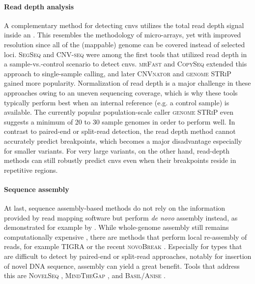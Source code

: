 \paragraph{Read depth analysis}
A complementary method for detecting \acp{cnv} utilizes the total read depth
signal inside an \sv. This resembles the methodology of micro-arrays, yet with
improved resolution since all of the (mappable) genome can be covered instead
of selected loci. \textsc{SegSeq} \citep{Chiang2009} and \textsc{CNV-seq}
\citep{Xie2009} were among the first tools that utilized read depth in a
sample-vs.-control scenario to detect \acp{cnv}. \textsc{mrFast}
\citep{Alkan2009} and \textsc{CopySeq} \citep{Waszak2010} extended this
approach to single-sample \cnv calling, and later \textsc{CNVnator}
\citep{Abyzov2011} and \textsc{genome STRiP} \citep{Handsaker2015} gained more
popularity. Normalization of read depth is a major challenge in these approaches
owing to an uneven sequencing coverage, which is why these tools typically
perform best when an internal reference (e.g. a control sample) is available.
The currently popular population-scale \cnv caller \textsc{genome STRiP} even
suggests a minimum of 20 to 30 sample genomes in order to perform well. In
contrast to paired-end or split-read detection, the read depth method cannot
accurately predict breakpoints, which becomes a major disadvantage especially
for smaller variants. For very large variants, on the other hand, read-depth
methods can still robustly predict \acp{cnv} even when their breakpoints reside
in repetitive regions.

\paragraph{Sequence assembly} At last, sequence assembly-based methods do not rely on the
information provided by read mapping software but perform \textit{de novo}
assembly instead, as demonstrated for example by \citep{Li2011a}.
While whole-genome assembly still remains computationally expensive
\citep{Bradnam2013}, there are methods that perform local re-assembly of reads,
for example \textsc{TIGRA} \citep{Chen2014b} or the recent \textsc{novoBreak}
\citep{Chong2017}. Especially for \sv types that are difficult to detect by
paired-end or split-read approaches, notably for insertion of novel DNA sequence,
assembly can yield a great benefit. Tools that address this are \textsc{NovelSeq}
\citep{Hajirasouliha2010}, \textsc{MindTheGap} \citep{Rizk2014}, and
\textsc{Basil/Anise} \citep{Holtgrewe2015}.

